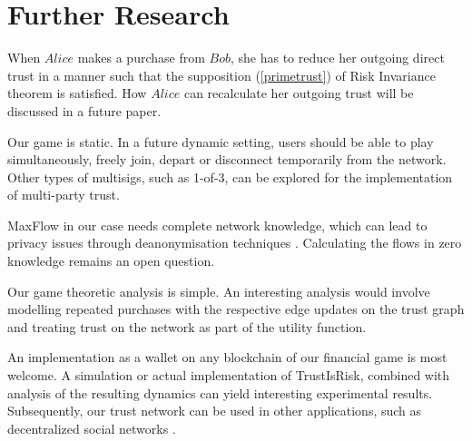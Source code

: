 \section{Further Research}

      When $Alice$ makes a purchase from $Bob$, she has to reduce her outgoing direct trust in a manner such that the
      supposition (\ref{primetrust}) of Risk Invariance theorem is satisfied. How $Alice$ can recalculate her outgoing
      trust will be discussed in a future paper.

      Our game is static. In a future dynamic setting, users should be able to play simultaneously, freely join, depart or
      disconnect temporarily from the network. Other types of multisigs, such as 1-of-3, can be explored for the
      implementation of multi-party trust.

      MaxFlow in our case needs complete network knowledge, which can lead to privacy issues through deanonymisation
      techniques \cite{deanonymisation}. Calculating the flows in zero knowledge remains an open question.

      Our game theoretic analysis is simple. An interesting analysis would involve modelling repeated purchases with the
      respective edge updates on the trust graph and treating trust on the network as part of the utility function.

      An implementation as a wallet on any blockchain of our financial game is most welcome. A simulation or actual
      implementation of TrustIsRisk, combined with analysis of the resulting dynamics can yield interesting experimental
      results. Subsequently, our trust network can be used in other applications, such as decentralized social networks
      \cite{synereo}.

